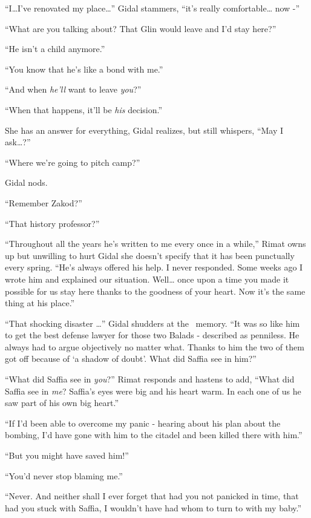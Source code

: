 \documentclass[twoside,11pt]{book}
\begin{document}
``I{\dots}I've renovated my place{\dots}'' Gidal stammers, ``it's really
comfortable{\dots} now -''

``What are you talking about? That Glin would leave and I'd stay here?''

``He isn't a child anymore.''

``You know that he's like a bond with me.''

``And when \textit{he'll} want to leave \textit{you}?''

``When that happens, it'll be \textit{his} decision.''

She has an answer for everything, Gidal realizes, but still whispers, ``May I ask{\dots}?''

``Where we're going to pitch camp?''

Gidal nods.

``Remember Zakod?''

``That history professor?''

``Throughout all the years he's written to me every once in a while,'' Rimat owns up but
unwilling to hurt Gidal she doesn't specify that it has been
punctually every spring. ``He's always offered his help. I never
responded. Some weeks ago I wrote him and explained our situation. Well{\dots} once upon a time you made it possible
for us stay here thanks to the goodness of your heart. Now it's the same thing at his
place.''

``That shocking disaster {\dots}'' Gidal shudders at the
\ memory. ``It was so like him to get the best defense lawyer for those two Balads -
described as penniless. He always had to argue objectively no matter what. Thanks to him the two of them got off
because of `a shadow of doubt'. What did Saffia see in him?''

``What did Saffia see in \textit{you}?'' Rimat responds and hastens to add,
``What did Saffia see in \textit{me}? Saffia's eyes were big and his heart warm. In each one of us he saw
part of his own big heart.''

``If I'd been able to overcome my panic - hearing about his plan about the bombing, I'd have gone with him
to the citadel and been killed there with him.''

``But you might have saved him!''

``You'd never stop blaming me.''

``Never. And neither shall I ever forget that had you not panicked in time, that had you
stuck with Saffia, I wouldn't have had whom to turn to with my baby.''
\end{document}
